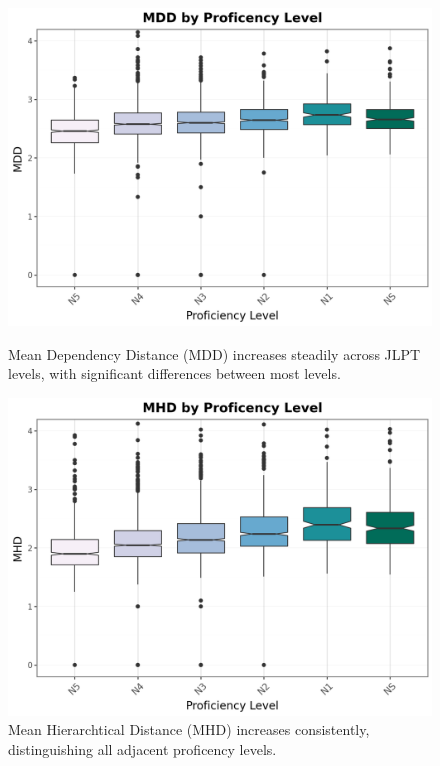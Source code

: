 \begin{figure}[htbp]
    \centering
    \begin{minipage}{.48\textwidth}
        \centering
    \includegraphics[scale=.4]{img/MDD}
    \caption[Mean Dependency Distance across JLPT Proficency Levels]{Mean Dependency Distance (MDD) increases steadily across JLPT levels, with significant differences between most levels.}
        \label{fig:mdd}
    \end{minipage}
    \hfill
\begin{minipage}{.48\textwidth}
        \centering
        \includegraphics[scale=.4]{img/MHD}
        \caption[Mean Hierarchtical Distance across JLPT Proficency Levels]{Mean Hierarchtical Distance (MHD) increases consistently, distinguishing all adjacent proficency levels.}
\label{fig:mhd}
\end{minipage}
    \end{figure}

